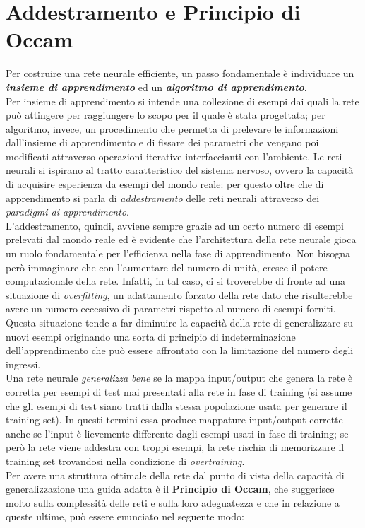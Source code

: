 \documentclass[12pt,a4paper,oneside]{book}
\begin{document}
	\section{Addestramento e Principio di Occam}
		Per costruire una rete neurale efficiente, un passo fondamentale è individuare un \emph{\textbf{insieme di apprendimento}} ed un \emph{\textbf{algoritmo di apprendimento}}.\\
		Per insieme di apprendimento si intende una collezione di esempi dai quali la rete può attingere per raggiungere lo scopo per il quale è stata progettata; per algoritmo, invece, un procedimento che permetta di prelevare le informazioni dall'insieme di apprendimento e di fissare dei parametri che vengano poi modificati attraverso operazioni iterative interfaccianti con l'ambiente.
		Le reti neurali si ispirano al tratto caratteristico del sistema nervoso, ovvero la capacità di acquisire esperienza da esempi del mondo reale: per questo oltre che di apprendimento si parla di \emph{addestramento} delle reti neurali attraverso dei \textit{paradigmi di apprendimento}.\\
		L’addestramento, quindi, avviene sempre grazie ad un certo numero di esempi prelevati dal mondo reale ed è evidente che l’architettura della rete neurale gioca un ruolo fondamentale per l’efficienza nella fase di apprendimento. Non bisogna però immaginare che con l'aumentare del numero di unità, cresce il potere computazionale della rete. Infatti, in tal caso, ci si troverebbe di fronte ad una situazione di \emph{overfitting}, un adattamento forzato della rete dato che risulterebbe avere un numero eccessivo di parametri rispetto al numero di esempi forniti. Questa situazione tende a far diminuire la capacità della rete di generalizzare su nuovi esempi originando una sorta di principio di indeterminazione dell'apprendimento che può essere affrontato con la limitazione del numero degli ingressi.\\ 
		Una rete neurale \emph{generalizza bene} se la mappa input/output che genera la rete è corretta per esempi di test mai presentati alla rete in fase di training (si assume che gli esempi di test siano tratti dalla stessa popolazione usata per generare il training set). In questi termini essa produce mappature input/output corrette anche se l’input è lievemente differente dagli esempi usati in fase di training; se però la rete viene addestra con troppi esempi, la rete rischia di memorizzare il training set trovandosi nella condizione di \emph{overtraining}. \\ 
		Per avere una struttura ottimale della rete dal punto di vista della capacità di generalizzazione una guida adatta è il \textbf{Principio di Occam}, che suggerisce molto sulla complessità delle reti e sulla loro adeguatezza e che in relazione a queste ultime, può essere enunciato nel seguente modo:
		
\end{document}
